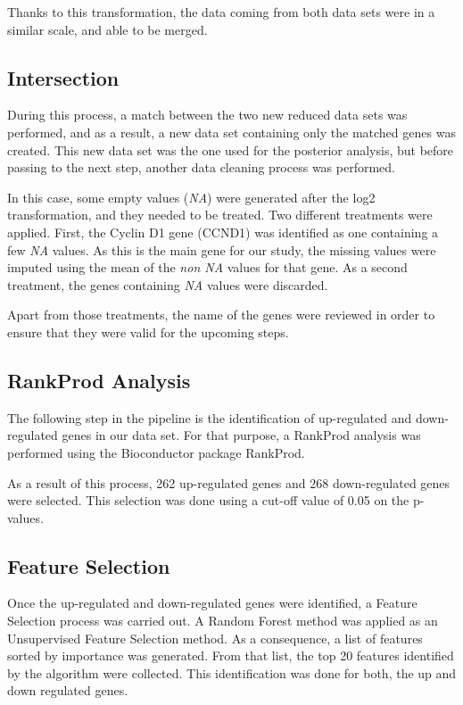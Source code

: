 Thanks to this transformation, the data coming from both data sets were in a similar scale, and able to be merged.

\subsection{Intersection}

During this process, a match between the two new reduced data sets was performed, and as a result, a new data set containing only the matched genes was created. This new data set was the one used for the posterior analysis, but before passing to the next step, another data cleaning process was performed.

In this case, some empty values (\textit{NA}) were generated after the log2 transformation, and they needed to be treated.
Two different treatments were applied. First, the Cyclin D1 gene (CCND1) was identified as one containing a few \textit{NA} values. As this is the main gene for our study, the missing values were imputed using the mean of the \textit{non NA} values for that gene.
As a second treatment, the genes containing \textit{NA} values were discarded.

Apart from those treatments, the name of the genes were reviewed in order to ensure that they were valid for the upcoming steps.

\subsection{RankProd Analysis}
The following step in the pipeline is the identification of up-regulated and down-regulated genes in our data set. For that purpose, a RankProd analysis was performed using the Bioconductor package RankProd. 

As a result of this process, 262 up-regulated genes and 268 down-regulated genes were selected. This selection was done using a cut-off value of 0.05 on the p-values.

\subsection{Feature Selection}
Once the up-regulated and down-regulated genes were identified, a Feature Selection process was carried out. 
A Random Forest method was applied as an Unsupervised Feature Selection method.
As a consequence, a list of features sorted by importance was generated. From that list, the top 20 features identified by the algorithm were collected. This identification was done for both, the up and down regulated genes.

